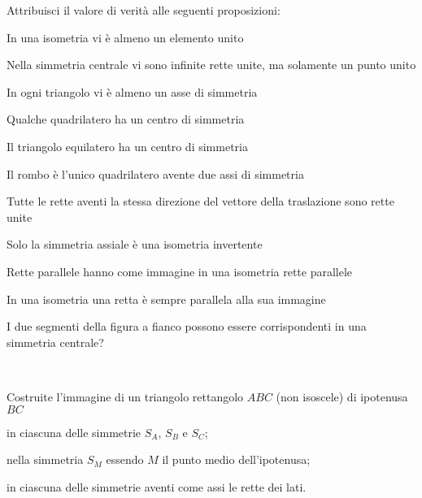 \begin{esercizio}
\label{ese:8.90} %
Attribuisci il valore di verità alle seguenti proposizioni:
\begin{enumeratea}
\item In una isometria vi è almeno un elemento 
unito\hfill\boxV\quad\boxF
\item Nella simmetria centrale vi sono infinite rette unite, ma 
solamente un punto unito\tab\tab\hfill\boxV\quad\boxF
\item In ogni triangolo vi è almeno un asse di 
simmetria\hfill\boxV\quad\boxF
\item Qualche quadrilatero ha un centro di 
simmetria\hfill\boxV\quad\boxF
\item Il triangolo equilatero ha un centro di 
simmetria\hfill\boxV\quad\boxF
\item Il rombo è l'unico quadrilatero avente due assi di 
simmetria\hfill\boxV\quad\boxF
\item Tutte le rette aventi la stessa direzione del vettore della 
traslazione sono rette unite\tab\tab\hfill\boxV\quad\boxF
\item Solo la simmetria assiale è una isometria 
invertente\hfill\boxV\quad\boxF
\item Rette parallele hanno come immagine in una isometria rette 
parallele\hfill\boxV\quad\boxF
\item In una isometria una retta è sempre parallela alla sua 
immagine\hfill\boxV\quad\boxF
\end{enumeratea}
\end{esercizio}


\begin{esercizio}
\label{ese:8.94} %
\noindent\begin{minipage}{0.75\textwidth}\parindent15pt
I due segmenti della figura a fianco possono essere corrispondenti in 
una simmetria centrale?
\end{minipage}\hfil
\begin{minipage}{0.25\textwidth}
  \centering~~
\end{minipage}\vspace{8pt} 
\end{esercizio}

\begin{esercizio}
\label{ese:8.96} %
Costruite l'immagine di un triangolo rettangolo $ABC$ (non isoscele) 
di ipotenusa $BC$
\begin{enumeratea}
\item in ciascuna delle simmetrie $S_A$, $S_B$ e $S_C$;
\item nella simmetria $S_M$ essendo $M$ il punto medio dell'ipotenusa;
\item in ciascuna delle simmetrie aventi come assi le rette dei lati.
\end{enumeratea}
\end{esercizio}

